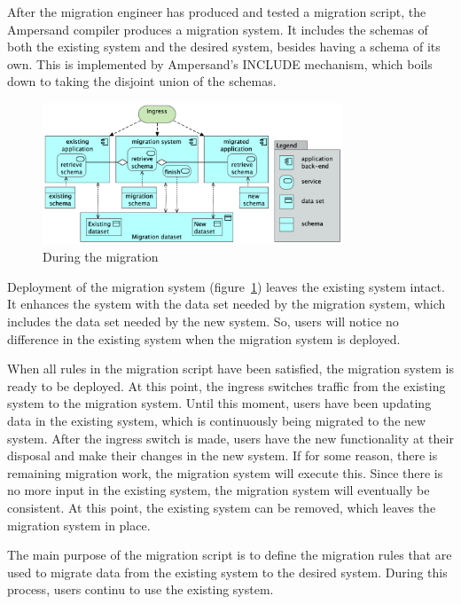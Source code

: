 \documentclass{elsarticle}
\begin{document}
   After the migration engineer has produced and tested a migration script, the Ampersand compiler produces a migration system.
   It includes the schemas of both the existing system and the desired system, besides having a schema of its own.
   This is implemented by Ampersand's INCLUDE mechanism, which boils down to taking the disjoint union of the schemas.
\begin{figure}
   \centering
   \includegraphics[width=0.8\textwidth]{figures/During migration.png}
   \caption{During the migration}
   \label{fig:during}
\end{figure}
   Deployment of the migration system (figure~\ref{fig:during}) leaves the existing system intact.
   It enhances the system with the data set needed by the migration system, which includes the data set needed by the new system.
   So, users will notice no difference in the existing system when the migration system is deployed.

   When all rules in the migration script have been satisfied, the migration system is ready to be deployed.
   At this point, the ingress switches traffic from the existing system to the migration system.
   Until this moment, users have been updating data in the existing system, which is continuously being migrated to the new system.
   After the ingress switch is made, users have the new functionality at their disposal and make their changes in the new system.
   If for some reason, there is remaining migration work, the migration system will execute this.
   Since there is no more input in the existing system, the migration system will eventually be consistent.
   At this point, the existing system can be removed, which leaves the migration system in place.


   The main purpose of the migration script is to define the migration rules that are used to migrate data from the existing system to the desired system.
   During this process, users continu to use the existing system.
\end{document}
